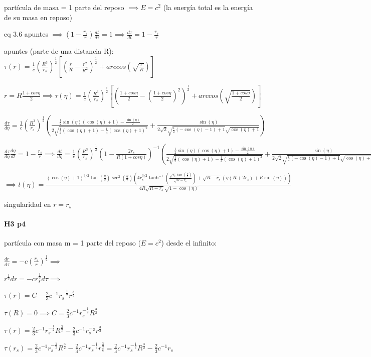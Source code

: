 \documentclass[12pt]{book}
\begin{document}
partícula de masa = 1 parte del  reposo $\implies E = c^2$  (la energía total es la energía de su masa en reposo)

eq 3.6 apuntes $\implies (1-\frac{r_s}{r}) \frac{dt}{d\tau} = 1 \implies \frac{d\tau}{dt} = 1-\frac{r_s}{r}  $

apuntes (parte de una distancia R): $\tau(r) = \frac{1}{c} (\frac{R^3}{r_s})^{\frac{1}{2}} [(\frac{r}{R} -\frac{r^2}{R^2})^{\frac{1}{2}} + arccos(\sqrt{\frac{r}{R}}) ] $

$r = R \frac{1+cos \eta}{2} \implies \tau(\eta) = \frac{1}{c} (\frac{R^3}{r_s})^{\frac{1}{2}} [(\frac{1+cos \eta}{2} -(\frac{1+cos \eta}{2}) ^2)^{\frac{1}{2}} + arccos(\sqrt{\frac{1+cos \eta}{2}}) ] $

$\frac{d\tau}{d\eta} =  \frac{1}{c} (\frac{R^3}{r_s})^{\frac{1}{2}} ( \frac{\frac{1}{2} \sin (\eta) (\cos (\eta)+1)-\frac{\sin (\eta)}{2}}{2 \sqrt{\frac{1}{2} (\cos (\eta)+1)-\frac{1}{4} (\cos (\eta)+1)^2}} + \frac{\sin (\eta)}{2 \sqrt{2} \sqrt{\frac{1}{2} (-\cos (\eta)-1)+1} \sqrt{\cos (\eta)+1}} )$

$\frac{d\tau}{d\eta} \frac{d\eta}{dt} = 1-\frac{r_s}{r} \implies \frac{dt}{d\eta} =  \frac{1}{c} (\frac{R^3}{r_s})^{\frac{1}{2}} (1-\frac{2 r_s}{R(1+cos \eta)})^{-1} ( \frac{\frac{1}{2} \sin (\eta) (\cos (\eta)+1)-\frac{\sin (\eta)}{2}}{2 \sqrt{\frac{1}{2} (\cos (\eta)+1)-\frac{1}{4} (\cos (\eta)+1)^2}} + \frac{\sin (\eta)}{2 \sqrt{2} \sqrt{\frac{1}{2} (-\cos (\eta)-1)+1} \sqrt{\cos (\eta)+1}} ) $

$\implies t(\eta) = \frac{(\cos (\eta)+1)^{3/2} \tan \left(\frac{\eta}{2}\right) \sec ^2\left(\frac{\eta}{2}\right) \left(4 r_s^{3/2} \tanh ^{-1}\left(\frac{\sqrt{r_s} \tan \left(\frac{\eta}{2}\right)}{\sqrt{R-r_s}}\right)+\sqrt{R-r_s} (\eta (R+2 r_s)+R \sin (\eta))\right)}{4 R \sqrt{R-r_s} \sqrt{1-\cos (\eta)}}$

singularidad en $r=r_s$

\paragraph{H3 p4}

partícula con masa m = 1 parte del reposo ($E = c^2$) desde el infinito:

$\frac{dr}{d\tau} = -c (\frac{r_s}{r})^{\frac{1}{2}} \implies$

$r^{\frac{1}{2}} dr = -c r_s^{\frac{1}{2}} d\tau \implies$

$\tau(r) = C -\frac{2}{3}c^{-1}r_s^{-\frac{1}{2}} r^{\frac{3}{2}} $

$\tau(R) = 0 \implies C =  \frac{2}{3}c^{-1}r_s^{-\frac{1}{2}} R^{\frac{3}{2}} $

$\tau(r) = \frac{2}{3}c^{-1}r_s^{-\frac{1}{2}} R^{\frac{3}{2}}  -\frac{2}{3}c^{-1}r_s^{-\frac{1}{2}} r^{\frac{3}{2}} $

$\tau(r_s) = \frac{2}{3}c^{-1}r_s^{-\frac{1}{2}} R^{\frac{3}{2}}  -\frac{2}{3}c^{-1}r_s^{-\frac{1}{2}} r_s^{\frac{3}{2}} = \frac{2}{3}c^{-1}r_s^{-\frac{1}{2}} R^{\frac{3}{2}}  -\frac{2}{3}c^{-1}r_s$
\end{document}
